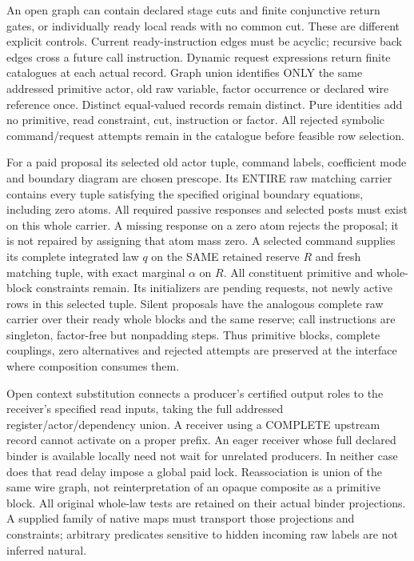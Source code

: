 \documentclass[11pt]{article}\usepackage{amsmath,amssymb,amsthm}
\begin{document}
An open graph can contain declared stage cuts and finite conjunctive return gates, or individually ready local reads with no common cut. These are different explicit controls. Current ready-instruction edges must be acyclic; recursive back edges cross a future call instruction. Dynamic request expressions return finite catalogues at each actual record. Graph union identifies ONLY the same addressed primitive actor, old raw variable, factor occurrence or declared wire reference once. Distinct equal-valued records remain distinct. Pure identities add no primitive, read constraint, cut, instruction or factor. All rejected symbolic command/request attempts remain in the catalogue before feasible row selection.

For a paid proposal its selected old actor tuple, command labels, coefficient mode and boundary diagram are chosen prescope. Its ENTIRE raw matching carrier contains every tuple satisfying the specified original boundary equations, including zero atoms. All required passive responses and selected posts must exist on this whole carrier. A missing response on a zero atom rejects the proposal; it is not repaired by assigning that atom mass zero. A selected command supplies its complete integrated law $q$ on the SAME retained reserve $R$ and fresh matching tuple, with exact marginal $\alpha$ on $R$. All constituent primitive and whole-block constraints remain. Its initializers are pending requests, not newly active rows in this selected tuple. Silent proposals have the analogous complete raw carrier over their ready whole blocks and the same reserve; call instructions are singleton, factor-free but nonpadding steps. Thus primitive blocks, complete couplings, zero alternatives and rejected attempts are preserved at the interface where composition consumes them.

Open context substitution connects a producer's certified output roles to the receiver's specified read inputs, taking the full addressed register/actor/dependency union. A receiver using a COMPLETE upstream record cannot activate on a proper prefix. An eager receiver whose full declared binder is available locally need not wait for unrelated producers. In neither case does that read delay impose a global paid lock. Reassociation is union of the same wire graph, not reinterpretation of an opaque composite as a primitive block. All original whole-law tests are retained on their actual binder projections. A supplied family of native maps must transport those projections and constraints; arbitrary predicates sensitive to hidden incoming raw labels are not inferred natural.
\end{document}
